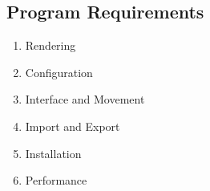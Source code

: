 \subsection{Program Requirements}

\begin{enumerate}
    \item Rendering \label{req_rendering}
    \item Configuration \label{req_configuration}
    \item Interface and Movement \label{req_interface}
    \item Import and Export \label{req_import_export}
    \item Installation \label{req_install}
    \item Performance \label{req_performance}
\end{enumerate}


\newcommand{\highPriority}[0]{{\color{red} \textbf{HIGH}}}
\newcommand{\mediumPriority}[0]{{\color{orange} \textbf{MEDIUM}}}
\newcommand{\lowPriority}[0]{{\color{yellow} \textbf{LOW}}}
\newcommand{\veryLowPriority}[0]{{\color{green} \textbf{VERY LOW}}}
\newcommand{\possibleFeature}[0]{{\color{purple} \textbf{POSSIBILTIY}}}


